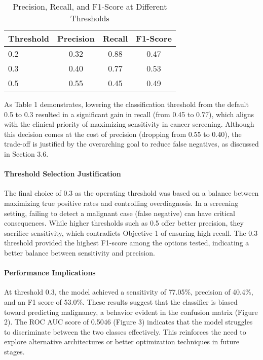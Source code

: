 \documentclass[12pt]{article}
\begin{document}
\begin{table}[H]
\centering
\caption{Precision, Recall, and F1-Score at Different Thresholds}
\begin{tabular}{lccc}
\toprule
Threshold & Precision & Recall & F1-Score \\
\midrule
0.2 & 0.32 & 0.88 & 0.47 \\
0.3 & 0.40 & 0.77 & 0.53 \\
0.5 & 0.55 & 0.45 & 0.49 \\
\bottomrule
\end{tabular}
\end{table}

As Table 1 demonstrates, lowering the classification threshold from the default 0.5 to 0.3 resulted in a significant gain in recall (from 0.45 to 0.77), which aligns with the clinical priority of maximizing sensitivity in cancer screening. Although this decision comes at the cost of precision (dropping from 0.55 to 0.40), the trade-off is justified by the overarching goal to reduce false negatives, as discussed in Section 3.6.

\paragraph{Threshold Selection Justification}
The final choice of 0.3 as the operating threshold was based on a balance between maximizing true positive rates and controlling overdiagnosis. In a screening setting, failing to detect a malignant case (false negative) can have critical consequences. While higher thresholds such as 0.5 offer better precision, they sacrifice sensitivity, which contradicts Objective 1 of ensuring high recall. The 0.3 threshold provided the highest F1-score among the options tested, indicating a better balance between sensitivity and precision.

\paragraph{Performance Implications}
At threshold 0.3, the model achieved a sensitivity of 77.05\%, precision of 40.4\%, and an F1 score of 53.0\%. These results suggest that the classifier is biased toward predicting malignancy, a behavior evident in the confusion matrix (Figure 2). The ROC AUC score of 0.5046 (Figure 3) indicates that the model struggles to discriminate between the two classes effectively. This reinforces the need to explore alternative architectures or better optimization techniques in future stages.
\end{document}
